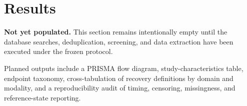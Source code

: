 \section{Results}

\textbf{Not yet populated.} This section remains intentionally empty until the database searches, deduplication, screening, and data extraction have been executed under the frozen protocol.

Planned outputs include a PRISMA flow diagram, study-characteristics table, endpoint taxonomy, cross-tabulation of recovery definitions by domain and modality, and a reproducibility audit of timing, censoring, missingness, and reference-state reporting.
